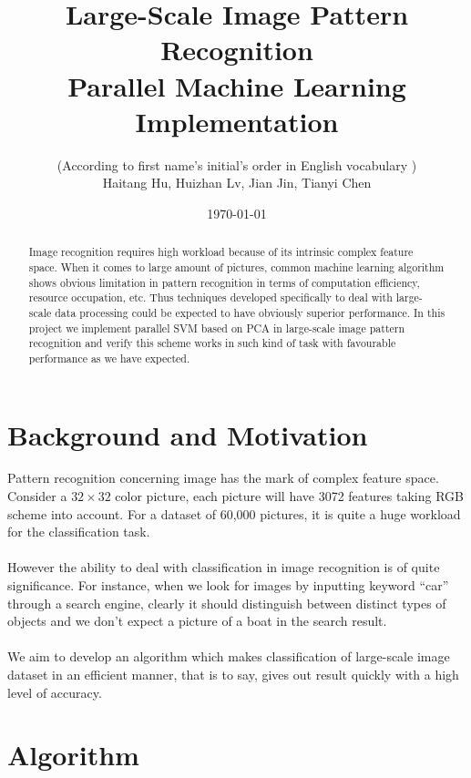 \documentclass[a4paper]{article}
\title{Large-Scale Image Pattern Recognition\\
Parallel Machine Learning Implementation}
\author{(According to first name's initial's order in English vocabulary )\\
Haitang Hu, Huizhan Lv, Jian Jin, Tianyi Chen}
\date{\today}
\begin{document}
\maketitle

\begin{abstract}
Image recognition requires high workload because of its intrinsic complex feature space. When it comes to large amount of pictures, common machine learning algorithm shows obvious limitation in pattern recognition in terms of computation efficiency, resource occupation, etc. Thus techniques developed specifically to deal with large-scale data processing could be expected to have obviously superior performance. In this project we implement parallel SVM based on PCA in large-scale image pattern recognition and verify this scheme works in such kind of task with favourable performance as we have expected. 
\end{abstract}

\section{Background and Motivation}
Pattern recognition concerning image has the mark of complex feature space. Consider a $32\times 32$ color picture, each picture will have 3072 features taking RGB scheme into account. For a dataset of 60,000 pictures, it is quite a huge workload for the classification task.\\
\\
However the ability to deal with classification in image recognition is of quite significance. For instance, when we  look for images by inputting keyword ``car'' through a search engine, clearly it should distinguish between distinct types of objects and we don't expect a picture of a boat in the search result.\\
\\
We aim to develop an algorithm which makes classification of large-scale image dataset in an efficient manner, that is to say, gives out result quickly with a high level of accuracy. 
\section{Algorithm}
\end{document}

